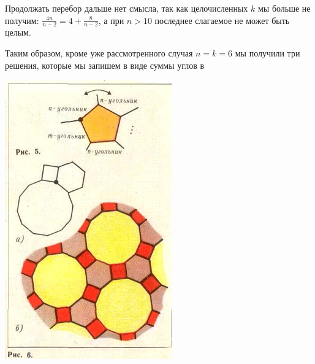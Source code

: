 \begin{multicols}{2}
\vspace{1em}
\noindent
Продолжать перебор дальше нет смысла, так как целочисленных $k$ мы больше не получим:
$\frac{4n}{n-2}=4+\frac{8}{n-2}$,\linebreak
а при $n>10$ последнее слагаемое не может быть целым.

Таким образом, кроме уже рассмотренного случая $n=k=6$ мы получили три решения, которые мы запишем в виде суммы углов в 

\columnbreak 
\begin{Figure}
    \centering
    \includegraphics[width=\columnwidth]{pic_1}
\end{Figure}



\end{multicols}
